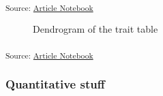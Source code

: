 \documentclass[
]{agujournal2019}
\begin{document}
\textsubscript{Source:
\href{https://BecksLab.github.io/ms_t_is_for_topology/index.qmd.html}{Article
Notebook}}

\begin{figure}[H]


\caption{\label{fig-dendo}Dendrogram of the trait table}

\end{figure}%

\textsubscript{Source:
\href{https://BecksLab.github.io/ms_t_is_for_topology/index.qmd.html}{Article
Notebook}}

\subsubsection{Quantitative stuff}\label{quantitative-stuff}
\end{document}
